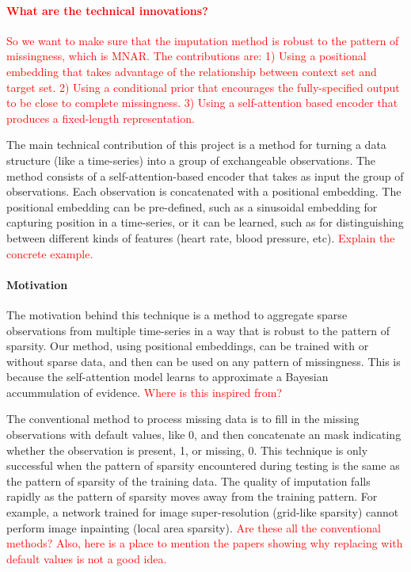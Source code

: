 \documentclass[a4paper,12pt,twoside,openright]{article}
\newcommand{\crit}[1]{\textcolor{red}{#1}}
\begin{document}
\crit{\paragraph{What are the technical innovations?} So we want to make sure that the imputation method is robust to the pattern of missingness, which is MNAR. The contributions are: 1) Using a positional embedding that takes advantage of the relationship between context set and target set. 2) Using a conditional prior that encourages the fully-specified output to be close to complete missingness. 3) Using a self-attention based encoder that produces a fixed-length representation.}

The main technical contribution of this project is a method for turning a data structure (like a time-series) into a group of exchangeable observations. The method consists of a self-attention-based encoder that takes as input the group of observations. Each observation is concatenated with a positional embedding. The positional embedding can be pre-defined, such as a sinusoidal embedding for capturing position in a time-series, or it can be learned, such as for distinguishing between different kinds of features (heart rate, blood pressure, etc). \crit{Explain the concrete example.}

\paragraph{Motivation} The motivation behind this technique is a method to aggregate sparse observations from multiple time-series in a way that is robust to the pattern of sparsity. Our method, using positional embeddings, can be trained with or without sparse data, and then can be used on any pattern of missingness. This is because the self-attention model learns to approximate a Bayesian accummulation of evidence. \crit{Where is this inspired from? \parencite{ilseAttentionbasedDeepMultiple2018}}

The conventional method to process missing data is to fill in the missing observations with default values, like 0, and then concatenate an mask indicating whether the observation is present, 1, or missing, 0. This technique is only successful when the pattern of sparsity encountered during testing is the same as the pattern of sparsity of the training data. The quality of imputation falls rapidly as the pattern of sparsity moves away from the training pattern. For example, a network trained for image super-resolution (grid-like sparsity) cannot perform image inpainting (local area sparsity). \crit{Are these all the conventional methods? Also, here is a place to mention the papers showing why replacing with default values is not a good idea.}
\end{document}
